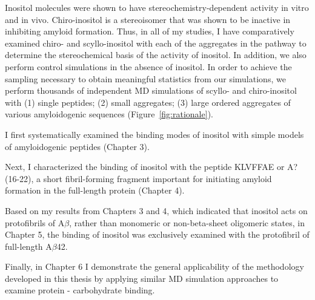 Inositol molecules were shown to have stereochemistry-dependent activity in vitro and in vivo. Chiro-inositol is a stereoisomer that was shown to be inactive in inhibiting amyloid formation. Thus, in all of my studies, I have comparatively examined chiro- and scyllo-inositol with each of the aggregates in the pathway to determine the stereochemical basis of the activity of inositol. In addition, we also perform control simulations in the absence of inositol.   In order to achieve the sampling necessary to obtain meaningful statistics from our simulations, we perform thousands of independent MD simulations of  scyllo- and chiro-inositol with (1) single peptides; (2) small aggregates; (3) large ordered aggregates of various amyloidogenic sequences (Figure~\ref{fig:rationale}).

I first systematically examined the binding modes of inositol with simple models of amyloidogenic peptides (Chapter 3).

Next, I characterized the binding of inositol with the peptide KLVFFAE or A?(16-22), a short fibril-forming fragment important for initiating amyloid formation in the full-length protein (Chapter 4).

Based on my results from Chapters 3 and 4, which indicated that inositol acts on protofibrils of A$\beta$, rather than monomeric or non-beta-sheet oligomeric states, in Chapter 5, the binding of inositol was exclusively examined with the protofibril of full-length A$\beta$42.

Finally, in Chapter 6 I demonstrate the general applicability of the methodology developed in this thesis by applying similar MD simulation approaches to examine protein - carbohydrate binding. 


\begin{singlespace}


\end{singlespace}

%


